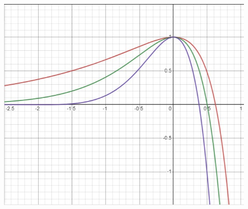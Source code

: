 \documentclass{article}
\begin{document}
    \includegraphics[width=125mm]{Screenshot 2022-12-05 165503.jpg}
\end{document}
